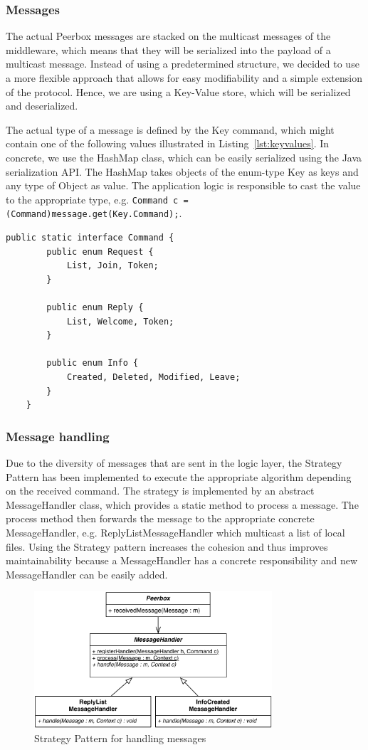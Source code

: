 \subsubsection{Messages}   
The actual Peerbox messages are stacked on the multicast messages of the middleware, which means that they will be serialized into the payload of a multicast message. 
Instead of using a predetermined structure, we decided to use a more flexible approach that allows for easy modifiability and a simple extension of the protocol. Hence, we are using a Key-Value store, which will be serialized and deserialized. 

The actual type of a message is defined by the Key command, which might contain one of the following values illustrated in Listing~\ref{lst:keyvalues}. In concrete, we use the HashMap class, which can be easily serialized using the Java serialization API.  The HashMap takes objects of the enum-type Key as keys and any type of Object as value. The application logic is responsible to cast the value to the appropriate type, e.g. \verb|Command c = (Command)message.get(Key.Command);|.

\begin{lstlisting}[caption=Possible values of command, label=lst:keyvalues]
public static interface Command {
		public enum Request {
			List, Join, Token;
		}

		public enum Reply {
			List, Welcome, Token;
		}

		public enum Info {
			Created, Deleted, Modified, Leave;
		}
	}
\end{lstlisting}

\subsubsection{Message handling}
Due to the diversity of messages that are sent in the logic layer, the Strategy Pattern has been implemented to execute the appropriate algorithm depending on the received command. The strategy is implemented by an abstract MessageHandler class, which provides a static method to process a message. The process method then forwards the message to the appropriate concrete MessageHandler, e.g. ReplyListMessageHandler which multicast a list of local files. 
Using the Strategy pattern increases the cohesion and thus improves maintainability because a MessageHandler has a concrete responsibility and new MessageHandler can be easily added.

\begin{figure}[htbp]
\centering
\includegraphics[height=2in]{figures/mhStrategy.pdf}
\caption{Strategy Pattern for handling messages}
\label{fig:figures_mhStrategy}
\end{figure}


